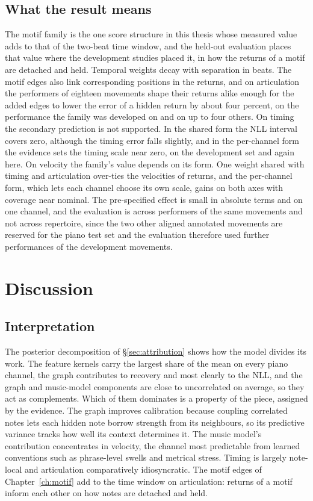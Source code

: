 \documentclass[11pt,a4paper]{report}
\begin{document}
\section{What the result means}\label{sec:motif-meaning}
The motif family is the one score structure in this thesis whose measured
value adds to that of the two-beat time window, and the held-out evaluation
places that value where the development studies placed it, in how the
returns of a motif are detached and held. Temporal weights decay with
separation in beats. The motif edges also link corresponding positions in
the returns, and on articulation the performers of eighteen movements
shape their returns alike enough for the added edges to lower the error of a hidden return by about four percent, on
the performance the family was developed on and on up to four others. On
timing the secondary prediction is not supported. In the shared form the
NLL interval covers zero, although the timing error falls slightly,
and in the per-channel form the evidence sets the timing scale near zero,
on the development set and again here. On
velocity the family's value depends on its form. One weight shared with
timing and articulation over-ties the velocities of returns, and the
per-channel form, which lets each channel choose its own scale, gains on
both axes with coverage near nominal. The pre-specified effect is small in absolute terms and on one
channel, and the evaluation is across performers of the same movements and
not across repertoire, since the two other aligned annotated movements are
reserved for the piano test set and the evaluation therefore used further
performances of the development movements.


\chapter{Discussion}\label{ch:discussion}

\section{Interpretation}
The posterior decomposition of \S\ref{sec:attribution} shows how the model
divides its work. The feature kernels carry the largest share of the mean on
every piano channel, the graph contributes to recovery and most clearly to
the NLL, and the graph and music-model components are close to
uncorrelated on average, so they act as complements. Which of them
dominates is a property of the piece, assigned by the evidence. The graph
improves calibration because coupling correlated notes lets each hidden
note borrow strength from its neighbours, so its predictive variance tracks
how well its context determines it. The music model's contribution
concentrates in velocity, the channel most predictable from learned
conventions such as phrase-level swells and metrical stress. Timing is
largely note-local and articulation comparatively idiosyncratic. The motif
edges of Chapter~\ref{ch:motif} add to the time window on articulation:
returns of a motif inform each other on how notes are detached and held.
\end{document}
